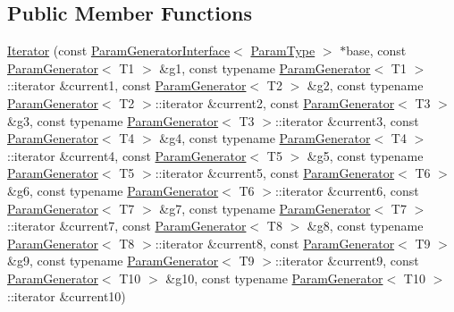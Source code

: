 \subsection*{\-Public \-Member \-Functions}
\begin{DoxyCompactItemize}
\item 
\hyperlink{classtesting_1_1internal_1_1CartesianProductGenerator10_1_1Iterator_ab0ceb7e6bbe609b4c3c6d20f547265be}{\-Iterator} (const \hyperlink{classtesting_1_1internal_1_1ParamGeneratorInterface}{\-Param\-Generator\-Interface}$<$ \hyperlink{classtesting_1_1internal_1_1CartesianProductGenerator10_adffde37eb66ea6d9917ab9fd24b46926}{\-Param\-Type} $>$ $\ast$base, const \hyperlink{classtesting_1_1internal_1_1ParamGenerator}{\-Param\-Generator}$<$ \-T1 $>$ \&g1, const typename \hyperlink{classtesting_1_1internal_1_1ParamGenerator}{\-Param\-Generator}$<$ \-T1 $>$\-::iterator \&current1, const \hyperlink{classtesting_1_1internal_1_1ParamGenerator}{\-Param\-Generator}$<$ \-T2 $>$ \&g2, const typename \hyperlink{classtesting_1_1internal_1_1ParamGenerator}{\-Param\-Generator}$<$ \-T2 $>$\-::iterator \&current2, const \hyperlink{classtesting_1_1internal_1_1ParamGenerator}{\-Param\-Generator}$<$ \-T3 $>$ \&g3, const typename \hyperlink{classtesting_1_1internal_1_1ParamGenerator}{\-Param\-Generator}$<$ \-T3 $>$\-::iterator \&current3, const \hyperlink{classtesting_1_1internal_1_1ParamGenerator}{\-Param\-Generator}$<$ \-T4 $>$ \&g4, const typename \hyperlink{classtesting_1_1internal_1_1ParamGenerator}{\-Param\-Generator}$<$ \-T4 $>$\-::iterator \&current4, const \hyperlink{classtesting_1_1internal_1_1ParamGenerator}{\-Param\-Generator}$<$ \-T5 $>$ \&g5, const typename \hyperlink{classtesting_1_1internal_1_1ParamGenerator}{\-Param\-Generator}$<$ \-T5 $>$\-::iterator \&current5, const \hyperlink{classtesting_1_1internal_1_1ParamGenerator}{\-Param\-Generator}$<$ \-T6 $>$ \&g6, const typename \hyperlink{classtesting_1_1internal_1_1ParamGenerator}{\-Param\-Generator}$<$ \-T6 $>$\-::iterator \&current6, const \hyperlink{classtesting_1_1internal_1_1ParamGenerator}{\-Param\-Generator}$<$ \-T7 $>$ \&g7, const typename \hyperlink{classtesting_1_1internal_1_1ParamGenerator}{\-Param\-Generator}$<$ \-T7 $>$\-::iterator \&current7, const \hyperlink{classtesting_1_1internal_1_1ParamGenerator}{\-Param\-Generator}$<$ \-T8 $>$ \&g8, const typename \hyperlink{classtesting_1_1internal_1_1ParamGenerator}{\-Param\-Generator}$<$ \-T8 $>$\-::iterator \&current8, const \hyperlink{classtesting_1_1internal_1_1ParamGenerator}{\-Param\-Generator}$<$ \-T9 $>$ \&g9, const typename \hyperlink{classtesting_1_1internal_1_1ParamGenerator}{\-Param\-Generator}$<$ \-T9 $>$\-::iterator \&current9, const \hyperlink{classtesting_1_1internal_1_1ParamGenerator}{\-Param\-Generator}$<$ \-T10 $>$ \&g10, const typename \hyperlink{classtesting_1_1internal_1_1ParamGenerator}{\-Param\-Generator}$<$ \-T10 $>$\-::iterator \&current10)

\end{DoxyCompactItemize}
